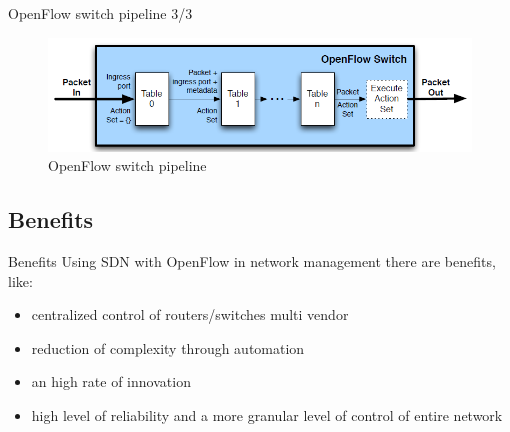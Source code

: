 \begin{frame}{OpenFlow switch pipeline \small{3/3}}
\begin{figure}
\includegraphics[scale=0.45]{Immagini/OpenFlowPipeline.png}
\caption{OpenFlow switch pipeline}
\label{fig:OpenFlowSwitchPipeline}
\end{figure}
\end{frame}

\subsection{Benefits}
\begin{frame}{Benefits}
Using SDN with OpenFlow in network management there are benefits, like:
\begin{itemize}
\item<2-> centralized control of routers/switches multi vendor
\item<3-> reduction of complexity through automation
\item<4-> an high rate of innovation
\item<5-> high level of reliability and a more granular level of control of entire network
\end{itemize}
\end{frame}